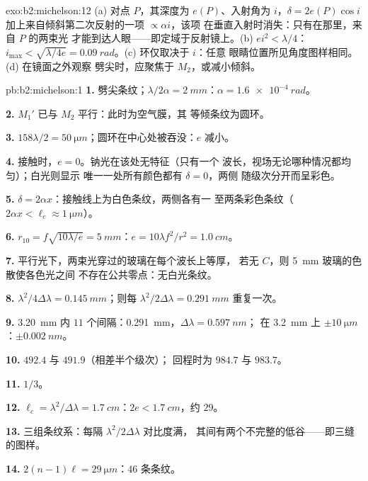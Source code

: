\begin{solution}{exo:b2:michelson:12}
(a) 对点 $P$，其深度为 $e(P)$、入射角为 $i$，$\delta = 2e(P)\cos i$
加上来自倾斜第二次反射的一项 $\propto\alpha i$，该项
在垂直入射时消失：只有在那里，来自 $P$ 的两束光
才能到达人眼——即定域于反射镜上。(b) $ei^2 < \lambda/4$：$i_{\max} <
\sqrt{\lambda/4e} = \qty{0.09}{rad}$。(c) 环仅取决于 $i$：任意
眼睛位置所见角度图样相同。(d) 在镜面之外观察
劈尖时，应聚焦于 $M_2$，或减小倾斜。
\end{solution}

\begin{solution}{pb:b2:michelson:1}
\textbf{1.} 劈尖条纹；$\lambda/2\alpha = \qty{2}{mm}$：$\alpha = \qty{1.6e-4}{rad}$。

\textbf{2.} $M_1'$ 已与 $M_2$ 平行：此时为空气膜，其
等倾条纹为圆环。

\textbf{3.} $158\lambda/2 = \qty{50}{\micro m}$；圆环在中心处被吞没：$e$
减小。

\textbf{4.} 接触时，$e = 0$。钠光在该处无特征（只有一个
波长，视场无论哪种情况都均匀）；白光则显示
唯一一处所有颜色都有 $\delta = 0$，两侧
随级次分开而呈彩色。

\textbf{5.} $\delta = 2\alpha x$：接触线上为白色条纹，两侧各有一
至两条彩色条纹（$2\alpha x < \ell_c \approx \qty{1}{\micro m}$）。

\textbf{6.} $r_{10} = f\sqrt{10\lambda/e} = \qty{5}{mm}$：$e = 10\lambda f^2/r^2 = \qty{1.0}{cm}$。

\textbf{7.} 平行光下，两束光穿过的玻璃在每个波长上等厚，
若无 $C$，则 \qty{5}{mm} 玻璃的色散使各色光之间
不存在公共零点：无白光条纹。

\textbf{8.} $\lambda^2/4\Delta\lambda = \qty{0.145}{mm}$；则每 $\lambda^2/2\Delta\lambda = \qty{0.291}{mm}$ 重复一次。

\textbf{9.} \qty{3.20}{mm} 内 $11$ 个间隔：\qty{0.291}{mm}，$\Delta\lambda = \qty{0.597}{nm}$；
在 \qty{3.2}{mm} 上 $\pm\qty{10}{\micro m}$：$\pm\qty{0.002}{nm}$。

\textbf{10.} $492.4$ 与 $491.9$（相差半个级次）；
回程时为 $984.7$ 与 $983.7$。

\textbf{11.} $1/3$。

\textbf{12.} $\ell_c = \lambda^2/\Delta\lambda = \qty{1.7}{cm}$：$2e < \qty{1.7}{cm}$，约 $29$。

\textbf{13.} 三组条纹系：每隔 $\lambda^2/2\Delta\lambda$ 对比度满，
其间有两个不完整的低谷——即三缝的图样。

\textbf{14.} $2(n - 1)\ell = \qty{29}{\micro m}$：$46$ 条条纹。


\end{solution}
